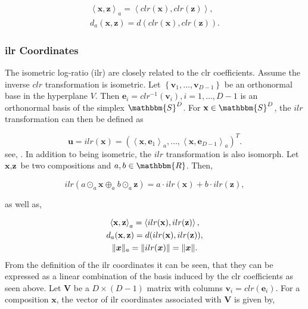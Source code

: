 \begin{gather}
\left\langle  \textbf{x},\textbf{z} \right\rangle_a = \left\langle  clr(\textbf{x}),clr(\textbf{z}) \right\rangle, \\
d_a(\textbf{x},\textbf{z}) = d(clr(\textbf{x}),clr(\textbf{z})).
\label{eq:clr Coefficients isometric}
\end{gather}

\subsubsection{ilr Coordinates}
\label{sec:ilr Coordinates}

The isometric log-ratio (ilr) are closely related to the clr coefficients. Assume the inverse $clr$ transformation is isometric. Let $\left\{\bm{v}_1,\ldots,\bm{v}_{D-1}\right\}$ be an orthonormal base in the hyperplane $V$. Then $\textbf{e}_i = clr^{-1}(\bm{v}_i), i=1,\ldots,D-1$ is an orthonormal basis of the simplex $\mathbbm{S}^D$. For $\textbf{x} \in \mathbbm{S}^D$, the $ilr$ transformation can then be defined as 

\begin{equation}
\textbf{u} = ilr(\textbf{x}) = \left(\left\langle \textbf{x},\textbf{e}_1\right\rangle_a,\ldots,\left\langle \textbf{x},\textbf{e}_{D-1}\right\rangle_a\right)^T.
\label{eq:ilr Coordinates}
\end{equation}
%
see, \textcite{Kynclova:2015}. In addition to being isometric, the $ilr$ transformation is also isomorph. Let $\textbf{x}, \textbf{z}$ be two compositions and $a, b  \in \mathbbm{R}$. Then,

\begin{equation}
ilr(a \odot_a \textbf{x} \oplus_a b \odot_a \textbf{z}) = a \cdot ilr(\textbf{x}) + b \cdot ilr(\textbf{z}),
\label{eq:ilr coordinates isomorph}
\end{equation}

as well as,

\begin{gather}
\left\langle  \textbf{x},\textbf{z} \right\rangle_a = \left\langle  ilr(\textbf{x}), ilr(\textbf{z}) \right\rangle, \\
d_a(\textbf{x},\textbf{z}) = d(ilr(\textbf{x}),ilr(\textbf{z})),\\
\lVert\bm{x}\rVert_a = \lVert ilr(\bm{x})\rVert = \lVert\bm{x}\rVert.
\label{eq:ilr coordinates isometric }
\end{gather}
%
From the definition of the ilr coordinates it can be seen, that they can be expressed as a linear combination of the basis induced by the clr coefficients as seen above. Let $\textbf{V}$ be a $D \times (D-1)$ matrix with columns $\textbf{v}_i = clr(\textbf{e}_i)$. For a composition $\textbf{x}$, the vector of ilr coordinates associated with $\textbf{V}$ is given by,

